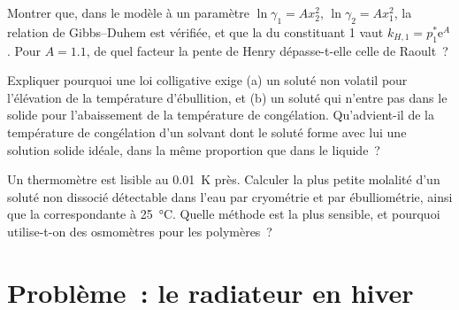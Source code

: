 \begin{exercise}[$\star\star\star$]\label{exo:b2:chemical-potential:10}
Montrer que, dans le modèle à un paramètre $\ln\gamma_1 = Ax_2^2$, $\ln\gamma_2 =
Ax_1^2$, la relation de Gibbs--Duhem est vérifiée, et que la  du
constituant 1 vaut $k_{H,1} = p_1^*\mathrm e^A$. Pour $A = 1.1$, de quel facteur
la pente de Henry dépasse-t-elle celle de Raoult~?
\end{exercise}

\begin{exercise}[$\star\star\star$]\label{exo:b2:chemical-potential:11}
Expliquer pourquoi une loi colligative exige (a) un soluté non volatil pour
l'élévation de la température d'ébullition, et (b) un soluté qui n'entre pas dans le solide pour
l'abaissement de la température de congélation. Qu'advient-il de la température de congélation d'un
solvant dont le soluté forme avec lui une solution solide idéale, dans la même
proportion que dans le liquide~?
\end{exercise}

\begin{exercise}[$\star\star\star$]\label{exo:b2:chemical-potential:12}
Un thermomètre est lisible au \qty{0.01}{K} près. Calculer la plus petite molalité d'un
soluté non dissocié détectable dans l'eau par cryométrie et par
ébulliométrie, ainsi que la  correspondante à \qty{25}{\celsius}.
Quelle méthode est la plus sensible, et pourquoi utilise-t-on des osmomètres pour les polymères~?
\end{exercise}

\section{Problème~: le radiateur en hiver}

